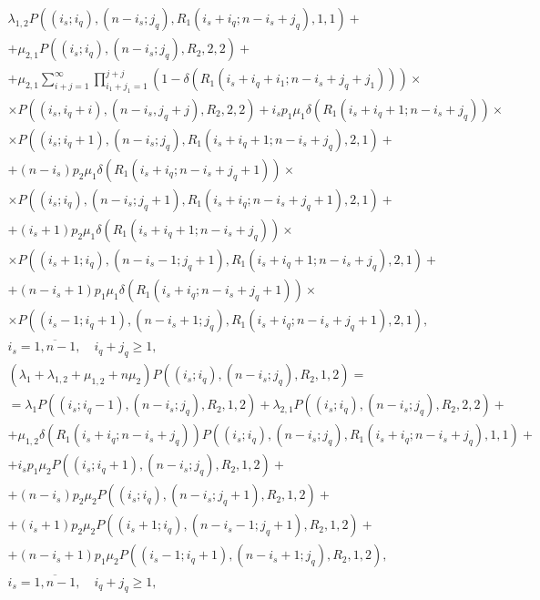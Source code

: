\documentclass[default]{subfiles}
\begin{document}
{\begin{multline}
  \lambda_{1,2} P\left((i_s;i_q),(n-i_s;j_q),R_1(i_s+i_q;
    n-i_s+j_q),1,1\right) + \\ +
  \mu_{2,1}  P\left((i_s;i_q),(n-i_s;j_q),R_2,2,2\right) + \\ +
  \mu_{2,1} \sum\limits_{i+j=1}^{\infty}\prod\limits_{i_1+j_1=1}^{j+j}\left(1-\delta\left(R_1 (i_s+i_q+i_1;n-i_s+j_q+j_1) \right)\right) \times \\
  \times P\left((i_s,i_q+i),(n-i_s,j_q+j),R_2,2,2\right) +
  i_s p_1\mu_1\delta\left(R_1(i_s+i_q+1;n-i_s+j_q)\right) \times \\
  \times P\left((i_s;i_q+1),(n-i_s;j_q),R_1(i_s+i_q+1;
    n-i_s+j_q),2,1\right) + \\ +
  (n-i_s) p_2 \mu_1 \delta\left(R_1(i_s+i_q;n-i_s+j_q+1)\right) \times \\
  \times P\left((i_s;i_q),(n-i_s;j_q+1),R_1(i_s+i_q;
    n-i_s+j_q+1),2,1\right) + \\ +
  (i_s+1) p_2 \mu_1 \delta\left(R_1(i_s+i_q+1;n-i_s+j_q)\right)  \times \\
  \times P\left((i_s+1;i_q),(n-i_s-1;j_q+1),R_1(i_s+i_q+1;
    n-i_s+j_q),2,1\right) + \\ +
  (n-i_s+1) p_1\mu_1 \delta\left(R_1(i_s+i_q;n-i_s+j_q+1)\right) \times \\
  \times  P\left((i_s-1;i_q+1),(n-i_s+1;j_q),R_1(i_s+i_q; n-i_s+j_q+1),2,1\right), \\
  i_s=\overline{1,n-1}, \quad i_q+j_q\geqslant  1,
\label{eq:10.2}
\end{multline}
\begin{multline}
  \left(\lambda_1 +\lambda_{1,2}+\mu_{1,2}+n\mu_2\right)
  P\left((i_s;i_q),(n-i_s;j_q),R_2,1,2\right) = \\ =
  \lambda_1 P\left((i_s;i_q-1),(n-i_s;j_q),R_2,1,2\right) +
  \lambda_{2,1} P\left((i_s;i_q),(n-i_s;j_q),R_2,2,2\right) + \\ +
  \mu_{1,2}  \delta\left(R_1(i_s+i_q; n-i_s+j_q)\right)
  P\left((i_s;i_q),(n-i_s;j_q),R_1(i_s+i_q; n-i_s+j_q),1,1\right) + \\ +
  i_s p_1\mu_2  P\left((i_s;i_q+1),(n-i_s;j_q),R_2,1,2\right) + \\ +
  (n-i_s) p_2 \mu_2  P\left((i_s;i_q),(n-i_s;j_q+1),R_2,1,2\right) +
  \\ +
  (i_s+1) p_2 \mu_2  P\left((i_s+1;i_q),(n-i_s-1;j_q+1),R_2,1,2\right)
  + \\ +
  (n-i_s+1) p_1\mu_2 P\left((i_s-1;i_q+1),(n-i_s+1;j_q),R_2,1,2\right), \\
  i_s=\overline{1,n-1}, \quad i_q+j_q\geqslant  1,

\end{multline}}
\end{document}
